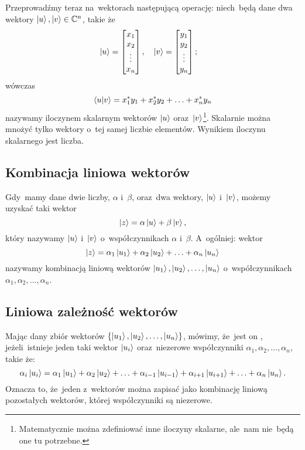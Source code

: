Przeprowadźmy teraz na~wektorach następującą operację:
niech~będą dane dwa wektory $\ket{u}, \ket{v}\in \mathbb{C}^n$, takie że
$$
	\ket{u} =
	\begin{bmatrix}
		x_1    \\
		x_2    \\
		\vdots \\
		x_{n}  \\
	\end{bmatrix},\quad
	\ket{v} =
	\begin{bmatrix}
		y_1    \\
		y_2    \\
		\vdots \\
		y_{n}  \\
	\end{bmatrix};\quad
$$
wówczas
$$
	\braket{u}{v} = {x}^*_1 y_1 + {x}^*_2 y_2 + \ldots + {x}^*_n y_n
$$
nazywamy iloczynem skalarnym wektorów $\ket{u}$ oraz~$\ket{v}$\footnote{Matematycznie
	można zdefiniować inne iloczyny skalarne,
	ale~nam nie~będą one tu potrzebne.}. Skalarnie można mnożyć tylko wektory o~tej
samej liczbie elementów. Wynikiem iloczynu skalarnego jest liczba.

\subsection{Kombinacja liniowa wektorów}
Gdy~mamy dane dwie liczby, $\alpha$ i~$\beta$, oraz~dwa wektory, $\ket{u}$ i~$\ket{v}$,
możemy uzyskać taki wektor
$$
	\ket{z} = \alpha \ket{u} + \beta \ket{v},
$$
który nazywamy 
$\ket{u}$ i~$\ket{v}$ o~współczynnikach $\alpha$ i~$\beta$.
A~ogólniej: wektor
$$
	\ket{z} = \alpha_1 \ket{u_1} + \alpha_2 \ket{u_2} + \ldots + \alpha_n \ket{u_n}
$$
nazywamy kombinacją liniową wektorów $\ket{u_1}, \ket{u_2}, \ldots, \ket{u_n}$
o~współczynnikach $\alpha_1, \alpha_2, \ldots, \alpha_n$.

\subsection{Liniowa zależność wektorów}
Mając dany zbiór wektorów $\{\ket{u_1}, \ket{u_2}, \ldots, \ket{u_n}\}$, mówimy,
że~jest on , jeżeli~istnieje
jeden taki wektor $\ket{u_i}$ oraz~niezerowe współczynniki $\alpha_1,
	\alpha_2, \ldots, \alpha_n$, takie że:
$$
	\alpha_i \ket{u_i} = \alpha_1 \ket{u_1} + \alpha_2 \ket{u_2} +
	\ldots + \alpha_{i-1} \ket{u_{i-1}} + \alpha_{i+1} \ket{u_{i+1}} + \ldots + \alpha_n \ket{u_n}.
$$
Oznacza to, że~jeden z~wektorów można zapisać jako kombinację liniową pozostałych wektorów, której współczynniki są niezerowe.

